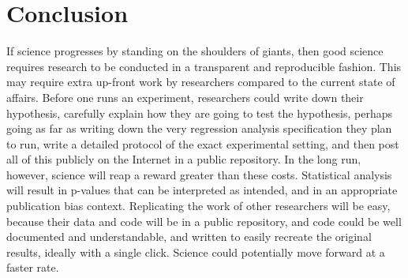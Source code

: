 \documentclass[12pt] {article}
\begin{document}
\section{Conclusion}\label{conclusion}

If science progresses by standing on the shoulders of giants, then good science requires research to be conducted in a transparent and reproducible fashion. This may require extra up-front work by researchers compared to the current state of affairs. Before one runs an experiment, researchers could write down their hypothesis, carefully explain how they are going to test the hypothesis, perhaps going as far as writing down the very regression analysis specification they plan to run, write a detailed protocol of the exact experimental setting, and then post all of this publicly on the Internet in a public repository. In the long run, however, science will reap a reward greater than these costs. Statistical analysis will result in p-values that can be interpreted as intended, and in an appropriate publication bias context. Replicating the work of other researchers will be easy, because their data and code will be in a public repository, and code could be well documented and understandable, and written to easily recreate the original results, ideally with a single click. Science could potentially move forward at a faster rate.


\newpage
\singlespacing


\end{document}
